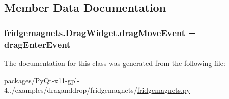 \subsection{Member Data Documentation}
\hypertarget{classfridgemagnets_1_1DragWidget_aedafb022399e91d8a41f651fc973e153}{}
\subsubsection[{drag\+Move\+Event}]{\setlength{\rightskip}{0pt plus 5cm}fridgemagnets.\+Drag\+Widget.\+drag\+Move\+Event = {\bf drag\+Enter\+Event}\hspace{0.3cm}{\ttfamily [static]}}\label{classfridgemagnets_1_1DragWidget_aedafb022399e91d8a41f651fc973e153}


The documentation for this class was generated from the following file\+:\begin{DoxyCompactItemize}
\item 
packages/\+Py\+Qt-\/x11-\/gpl-\/4../examples/draganddrop/fridgemagnets/\hyperlink{fridgemagnets_8py}{fridgemagnets.\+py}\end{DoxyCompactItemize}
